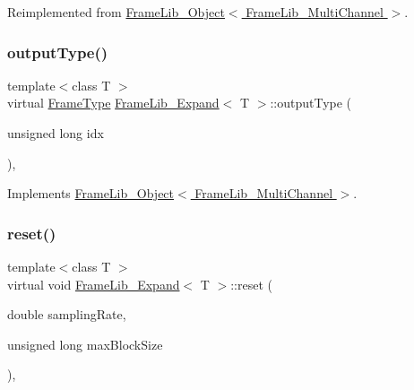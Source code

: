 Reimplemented from \hyperlink{class_frame_lib___object_a6e6d79e8d620eedbaa50abf324cdedf5}{Frame\+Lib\+\_\+\+Object$<$ Frame\+Lib\+\_\+\+Multi\+Channel $>$}.

\mbox{\label{class_frame_lib___expand_a926ee7c8b222e018cae92ffbdecb1270}} 
\subsubsection{\texorpdfstring{output\+Type()}{outputType()}}
{\footnotesize\ttfamily template$<$class T $>$ \\
virtual \hyperlink{_frame_lib___types_8h_ad495a9f61af7fff07d7e97979d1ab854}{Frame\+Type} \hyperlink{class_frame_lib___expand}{Frame\+Lib\+\_\+\+Expand}$<$ T $>$\+::output\+Type (\begin{DoxyParamCaption}\item[{unsigned long}]{idx }\end{DoxyParamCaption})\hspace{0.3cm}{\ttfamily [inline]}, {\ttfamily [virtual]}}



Implements \hyperlink{class_frame_lib___object_abdfca6b259f5fc7f97f4f2e016c1d80f}{Frame\+Lib\+\_\+\+Object$<$ Frame\+Lib\+\_\+\+Multi\+Channel $>$}.

\mbox{\label{class_frame_lib___expand_a579f16ec32e05ff84ee766038012fc3f}} 
\subsubsection{\texorpdfstring{reset()}{reset()}}
{\footnotesize\ttfamily template$<$class T $>$ \\
virtual void \hyperlink{class_frame_lib___expand}{Frame\+Lib\+\_\+\+Expand}$<$ T $>$\+::reset (\begin{DoxyParamCaption}\item[{double}]{sampling\+Rate,  }\item[{unsigned long}]{max\+Block\+Size }\end{DoxyParamCaption})\hspace{0.3cm}{\ttfamily [inline]}, {\ttfamily [virtual]}}



